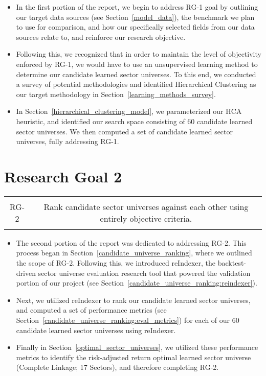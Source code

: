 \documentclass[../main.tex]{subfiles}
\begin{document}
\begin{itemize}
    \item In the first portion of the report, we begin to address RG-1 goal by outlining our target data sources (see Section~\ref{model_data}), the benchmark we plan to use for comparison, and how our specifically selected fields from our data sources relate to, and reinforce our research objective.
    \item Following this, we recognized that in order to maintain the level of objectivity enforced by RG-1, we would have to use an unsupervised learning method to determine our candidate learned sector universes. To this end, we conducted a survey of potential methodologies and identified Hierarchical Clustering as our target methodology in Section~\ref{learning_methods_survey}.
    \item In Section~\ref{hierarchical_clustering_model}, we parameterized our HCA heuristic, and identified our search space consisting of 60 candidate learned sector universes. We then computed a set of candidate learned sector universes, fully addressing RG-1.
\end{itemize}


\section{Research Goal 2}

\begin{table}[h!]
    \centering
    \begin{tabular}{| c | c |}
        \hline
        &  \\
        RG-2 & Rank candidate sector universes against each other using entirely objective criteria. \\
        & \\
        \hline
    \end{tabular}
\end{table}

\begin{itemize}
    \item The second portion of the report was dedicated to addressing RG-2. This process began in Section~\ref{candidate_universe_ranking}, where we outlined the scope of RG-2. Following this, we introduced reIndexer, the backtest-driven sector universe evaluation research tool that powered the validation portion of our project (see Section~\ref{candidate_universe_ranking:reindexer}).
    \item Next, we utilized reIndexer to rank our candidate learned sector universes, and computed a set of performance metrics (see Section~\ref{candidate_universe_ranking:eval_metrics}) for each of our 60 candidate learned sector universes using reIndexer.
    \item Finally in Section~\ref{optimal_sector_universes}, we utilized these performance metrics to identify the risk-adjusted return optimal learned sector universe (Complete Linkage; 17 Sectors), and therefore completing RG-2.
\end{itemize}
\end{document}
